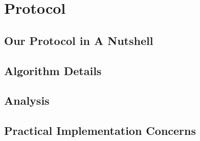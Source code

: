 \section{Protocol}

\subsection{Our Protocol in A Nutshell}

\subsection{Algorithm Details}

\subsection{Analysis}

\subsection{Practical Implementation Concerns}
